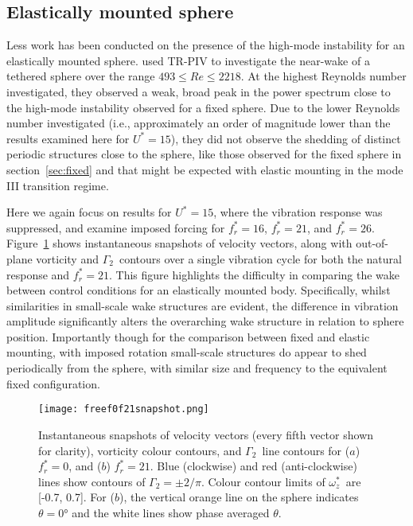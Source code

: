 \documentclass[3p]{elsarticle}
\newcommand{\Ustar}{\ensuremath{U^{*}}}
\newcommand{\freqrat}{\ensuremath{f_r^*}}
\newcommand{\gtwo}{\ensuremath{\Gamma_2}}
\newcommand{\wz}{\ensuremath{\omega_z^*}}
\begin{document}
\subsection{Elastically mounted sphere} \label{sec:free}%


Less work has been conducted on the presence of the high-mode
instability for an elastically mounted sphere. \citet{vanHout2013}
used TR-PIV to investigate the near-wake of a tethered sphere over the
range $493\leqslant Re\leqslant2218$. At the highest Reynolds number
investigated, they observed a weak, broad peak in the power spectrum
close to the high-mode instability observed for a fixed sphere. Due to
the lower Reynolds number investigated (i.e., approximately an order
of magnitude lower than the results examined here for $\Ustar=15$),
they did not observe the shedding of distinct periodic structures
close to the sphere, like those observed for the fixed sphere in
section~\ref{sec:fixed} and that might be expected with elastic
mounting in the mode III transition regime.

Here we again focus on results for $\Ustar=15$, where the vibration response was suppressed, and examine imposed forcing for $\freqrat=16$, $\freqrat=21$, and $\freqrat=26$. 
Figure~\ref{fig:freef0f21snapshot} shows instantaneous snapshots of velocity vectors, along with out-of-plane vorticity and \gtwo~contours over a single vibration cycle for both the natural response and $\freqrat=21$.  
This figure highlights the difficulty in comparing the wake between control conditions for an elastically mounted body.  
Specifically, whilst similarities in small-scale wake structures are evident, the difference in vibration amplitude significantly alters the overarching wake structure in relation to sphere position.  
Importantly though for the comparison between fixed and elastic mounting, with imposed rotation small-scale structures do appear to shed periodically from the sphere, with similar size and frequency to the equivalent fixed configuration.  
%
\begin{figure}
	\centering
	\texttt{[image: freef0f21snapshot.png]}
	\caption{Instantaneous snapshots of velocity vectors (every
		fifth vector shown for clarity), vorticity colour contours,
		and \gtwo~line contours for ($a$) $\freqrat=0$, and ($b$)
		$\freqrat=21$. Blue (clockwise) and red
		(anti-clockwise) lines show contours of $\gtwo= \pm 2/\pi$.
		Colour contour limits of \wz~are [-0.7, 0.7]. For ($b$), the
		vertical orange line on the sphere indicates $\theta = \ang{0}$ and the
		white lines show phase averaged $\theta$.}
	\label{fig:freef0f21snapshot}
\end{figure}
%
\end{document}
